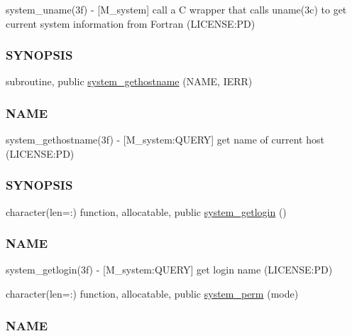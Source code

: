 \begin{DoxyCompactItemize}
\begin{DoxyCompactList}
system\+\_\+uname(3f) -\/ \mbox{[}M\+\_\+system\mbox{]} call a C wrapper that calls uname(3c) to get current system information from Fortran (L\+I\+C\+E\+N\+SE\+:PD) \subsubsection*{S\+Y\+N\+O\+P\+S\+IS}\end{DoxyCompactList}\item 
subroutine, public \mbox{\hyperlink{namespacem__system_a96fab225737afb77ff1cbba9866f0d05}{system\+\_\+gethostname}} (N\+A\+ME, I\+E\+RR)
\begin{DoxyCompactList}\small\item\em \subsubsection*{N\+A\+ME}

system\+\_\+gethostname(3f) -\/ \mbox{[}M\+\_\+system\+:Q\+U\+E\+RY\mbox{]} get name of current host (L\+I\+C\+E\+N\+SE\+:PD) \subsubsection*{S\+Y\+N\+O\+P\+S\+IS}\end{DoxyCompactList}\item 
character(len=\+:) function, allocatable, public \mbox{\hyperlink{namespacem__system_a70f78645a1f130734005e190d469529d}{system\+\_\+getlogin}} ()
\begin{DoxyCompactList}\small\item\em \subsubsection*{N\+A\+ME}

system\+\_\+getlogin(3f) -\/ \mbox{[}M\+\_\+system\+:Q\+U\+E\+RY\mbox{]} get login name (L\+I\+C\+E\+N\+SE\+:PD) \end{DoxyCompactList}\item 
character(len=\+:) function, allocatable, public \mbox{\hyperlink{namespacem__system_ae8f39e1d4e420396319105e4e81f92b5}{system\+\_\+perm}} (mode)
\begin{DoxyCompactList}\small\item\em \subsubsection*{N\+A\+ME}


\end{DoxyCompactList}
\end{DoxyCompactItemize}
